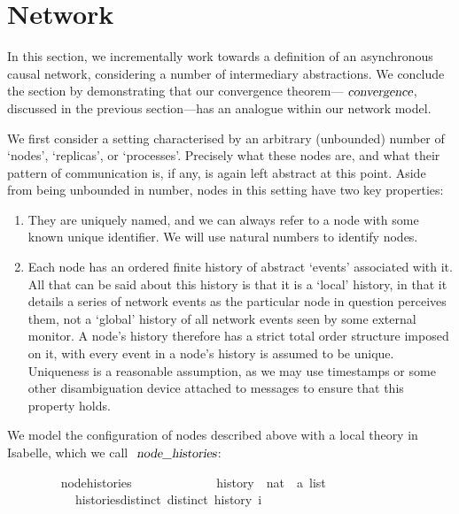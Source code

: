 \documentclass[acmlarge,review,anonymous]{acmart}\settopmatter{printfolios=true}
\begin{document}

\section{Network}
\label{sect.network}

In this section, we incrementally work towards a definition of an asynchronous causal network, considering a number of intermediary abstractions.
We conclude the section by demonstrating that our convergence theorem---$\isa{convergence}$, discussed in the previous section---has an analogue within our network model.

We first consider a setting characterised by an arbitrary (unbounded) number of `nodes', `replicas', or `processes'.
Precisely what these nodes are, and what their pattern of communication is, if any, is again left abstract at this point.
Aside from being unbounded in number, nodes in this setting have two key properties:
\begin{enumerate}
\item
They are uniquely named, and we can always refer to a node with some known unique identifier.
We will use natural numbers to identify nodes.
\item
Each node has an ordered finite history of abstract `events' associated with it.
All that can be said about this history is that it is a `local' history, in that it details a series of network events as the particular node in question perceives them, not a `global' history of all network events seen by some external monitor.
A node's history therefore has a strict total order structure imposed on it, with every event in a node's history is assumed to be unique.
Uniqueness is a reasonable assumption, as we may use timestamps or some other disambiguation device attached to messages to ensure that this property holds.
\end{enumerate}
We model the configuration of nodes described above with a local theory in Isabelle, which we call $\isa{node{\isacharunderscore}histories}$:
\\
\begin{isabellebody}
\ \ \ \ \ \ \ \  node{\isacharunderscore}histories\ {\isacharequal}\ \isanewline
\ \ \ \ \ \ \ \ \ \ \ history\ {\isacharcolon}{\isacharcolon}\ {\isachardoublequoteopen}nat\ {\isasymRightarrow}\ {\isacharprime}a\ list{\isachardoublequoteclose}\isanewline
\ \ \ \ \ \ \ \ \ \ \ histories{\isacharunderscore}distinct{\isacharcolon}\ {\isachardoublequoteopen}distinct\ {\isacharparenleft}history\ i{\isacharparenright}{\isachardoublequoteclose}
\end{isabellebody}
\end{document}
